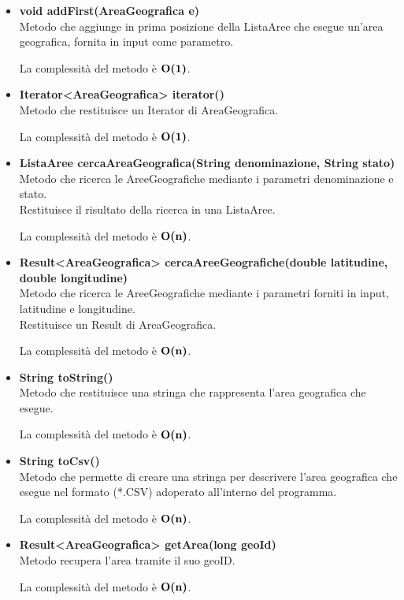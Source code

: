 \documentclass[a4paper, 12pt]{scrreprt}
\begin{document}
\begin{itemize}
				La complessit\`a del metodo \`e $\bigO\textbf{(n)}$.
				
				\item \textbf{void addFirst(AreaGeografica e)}
				\\Metodo che aggiunge in prima posizione della ListaAree che esegue un'area geografica, fornita in input come parametro.
				
				La complessit\`a del metodo \`e $\mathbf{O}\textbf{(1)}$.
				
				\item \textbf{Iterator<AreaGeografica> iterator()}
				\\Metodo che restituisce un Iterator di AreaGeografica.
				
				La complessit\`a del metodo \`e $\mathbf{O}\textbf{(1)}$.
				
				\item \textbf{ListaAree cercaAreaGeografica(String denominazione, String stato)}
				\\Metodo che ricerca le AreeGeografiche mediante i parametri denominazione e stato.
				\\Restituisce il risultato della ricerca in una ListaAree.
				
				La complessit\`a del metodo \`e $\bigO\textbf{(n)}$.
				
				\item \textbf{Result<AreaGeografica> cercaAreeGeografiche(double latitudine, double longitudine)}
				\\Metodo che ricerca le AreeGeografiche mediante i parametri forniti in input, latitudine e longitudine.
				\\Restituisce un Result di AreaGeografica.
				
				La complessit\`a del metodo \`e $\bigO\textbf{(n)}$.
				
				\item \textbf{String toString()}
				\\Metodo che restituisce una stringa che rappresenta l'area geografica che esegue.
				
				La complessit\`a del metodo \`e $\bigO\textbf{(n)}$.
				
				\item \textbf{String toCsv()}
				\\Metodo che permette di creare una stringa per descrivere l'area geografica che esegue nel formato (*.CSV) adoperato all'interno del programma.
				
				La complessit\`a del metodo \`e $\bigO\textbf{(n)}$.
				
				
				\item \textbf{Result<AreaGeografica> getArea(long geoId)}
				\\Metodo recupera l'area tramite il suo geoID.
				
				La complessit\`a del metodo \`e $\bigO\textbf{(n)}$.
				
			\end{itemize}
\end{document}
